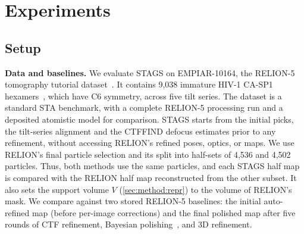 \section{Experiments}
\label{sec:results}


\subsection{Setup}
\label{sec:results:setup}

\noindent\textbf{Data and baselines.}
We evaluate STAGS on EMPIAR-10164, the RELION-5 tomography tutorial dataset~\cite{iudin2023empiar,burt2024relion5}. It contains 9,038 immature HIV-1 CA-SP1 hexamers~\cite{schur2016hiv}, which have C6 symmetry, across five tilt series. The dataset is a standard STA benchmark, with a complete RELION-5 processing run and a deposited atomistic model for comparison.
STAGS starts from the initial picks, the tilt-series alignment and the CTFFIND defocus estimates prior to any refinement, without accessing RELION's refined poses, optics, or maps.
We use RELION's final particle selection and its split into half-sets of 4,536 and 4,502 particles. Thus, both methods use the same particles, and each STAGS half map is compared with the RELION half map reconstructed from the other subset.
It also sets the support volume $V$ (\cref{sec:method:repr}) to the volume of RELION's mask.
We compare against two stored RELION-5 baselines: the initial auto-refined map (before per-image corrections) and the final polished map after five rounds of CTF refinement, Bayesian polishing~\cite{zivanov2019polishing}, and 3D refinement.
